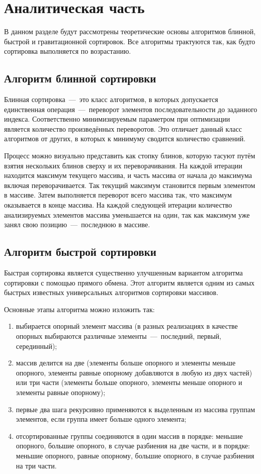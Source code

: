 \chapter{Аналитическая часть}
В данном разделе будут рассмотрены теоретические основы алгоритмов блинной, быстрой и гравитационной сортировок. Все алгоритмы трактуются так, как будто сортировка выполняется по возрастанию.

\section{Алгоритм блинной сортировки}
Блинная сортировка~---~это класс алгоритмов, в которых допускается единственная операция~---~переворот элементов последовательности до заданного индекса. Соответственно минимизируемым параметром при оптимизации является количество произведённых переворотов. Это отличает данный класс алгоритмов от других, в которых к минимуму сводится количество сравнений.

 Процесс можно визуально представить как стопку блинов, которую тасуют путём взятия нескольких блинов сверху и их переворачивания. На каждой итерации находится максимум текущего массива, и часть массива от начала до максимума включая переворачивается. Так текущий максимум становится первым элементом в массиве. Затем выполняется переворот всего массива так, что максимум оказывается в конце массива. На каждой следующей итерации количество анализируемых элементов массива уменьшается на один, так как максимум уже занял свою позицию~---~последнюю в массиве.

\section{Алгоритм быстрой сортировки}
Быстрая сортировка является существенно улучшенным вариантом алгоритма сортировки с помощью прямого обмена. Этот алгоритм является одним из самых быстрых известных универсальных алгоритмов сортировки массивов. 

Основные этапы алгоритма можно изложить так:
\begin{enumerate}[label={\arabic*)}]
	\item выбирается опорный элемент массива (в разных реализациях в качестве опорных выбираются различные элементы~---~последний, первый, серединный);
	\item массив делится на две (элементы больше опорного и элементы меньше опорного, элементы равные опорному добавляются в любую из двух частей) или три части (элементы больше опорного, элементы меньше опорного и элементы равные опорному);
	\item первые два шага рекурсивно применяются к выделенным из массива группам элементов, если группа имеет больше одного элемента;
	\item отсортированные группы соединяются в один массив в порядке: меньшие опорного, большие опорного, в случае разбиения на две части, и в порядке: меньшие опорного, равные опорному, большие опорного, в случае разбиения на три части.
\end{enumerate}

